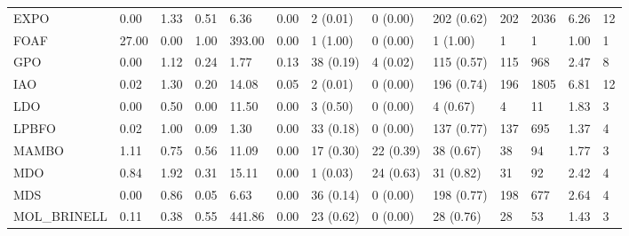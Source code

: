 \begin{table}
\begin{tabular}{m{3.5cm}m{2cm}m{2cm}m{2cm}m{2cm}m{2cm}m{2cm}m{2cm}m{2cm}m{2cm}m{2cm}m{2cm}m{2cm}}
EXPO                        &                0.00 &                  1.33 &                   0.51 &               6.36 &               0.00 &             2 (0.01) &   0 (0.00) &  202 (0.62) &  202 &            2036 &     6.26 &         12 \\
FOAF                        &               27.00 &                  0.00 &                   1.00 &             393.00 &               0.00 &             1 (1.00) &   0 (0.00) &    1 (1.00) &    1 &               1 &     1.00 &          1 \\
GPO                         &                0.00 &                  1.12 &                   0.24 &               1.77 &               0.13 &            38 (0.19) &   4 (0.02) &  115 (0.57) &  115 &             968 &     2.47 &          8 \\
IAO                         &                0.02 &                  1.30 &                   0.20 &              14.08 &               0.05 &             2 (0.01) &   0 (0.00) &  196 (0.74) &  196 &            1805 &     6.81 &         12 \\
LDO                         &                0.00 &                  0.50 &                   0.00 &              11.50 &               0.00 &             3 (0.50) &   0 (0.00) &    4 (0.67) &    4 &              11 &     1.83 &          3 \\
LPBFO                       &                0.02 &                  1.00 &                   0.09 &               1.30 &               0.00 &            33 (0.18) &   0 (0.00) &  137 (0.77) &  137 &             695 &     1.37 &          4 \\
MAMBO                       &                1.11 &                  0.75 &                   0.56 &              11.09 &               0.00 &            17 (0.30) &  22 (0.39) &   38 (0.67) &   38 &              94 &     1.77 &          3 \\
MDO                         &                0.84 &                  1.92 &                   0.31 &              15.11 &               0.00 &             1 (0.03) &  24 (0.63) &   31 (0.82) &   31 &              92 &     2.42 &          4 \\
MDS                         &                0.00 &                  0.86 &                   0.05 &               6.63 &               0.00 &            36 (0.14) &   0 (0.00) &  198 (0.77) &  198 &             677 &     2.64 &          4 \\
MOL\_BRINELL                 &                0.11 &                  0.38 &                   0.55 &             441.86 &               0.00 &            23 (0.62) &   0 (0.00) &   28 (0.76) &   28 &              53 &     1.43 &          3 \\

\end{tabular}
\end{table}
